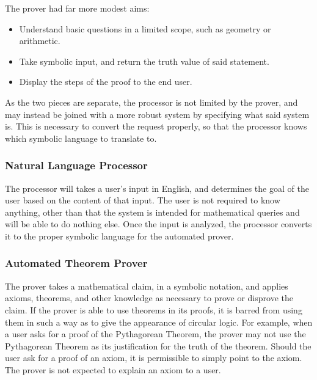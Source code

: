   The prover had far more modest aims:                                                                     
  \begin{itemize}                                                                                          
  \item{Understand basic questions in a limited scope, such as geometry or arithmetic.}                    
  \item{Take symbolic input, and return the truth value of said statement.}                                
  \item{Display the steps of the proof to the end user.}                                 

  \end{itemize}

  As the two pieces are separate, the processor is not limited by the prover, and may instead be joined with a more robust system by specifying what said system is. This is necessary to convert the request properly, so that the processor knows which symbolic language to translate to.                                 
  \subsubsection{Natural Language Processor}                                                               
The processor will takes a user's input in English, and determines the goal of the user based on the content of that input. The user is not required to know anything, other than that the system is intended for mathematical queries and will be able to do nothing else. Once the input is analyzed, the processor converts it to the proper symbolic language for the automated prover.                                         
  \subsubsection{Automated Theorem Prover}                                                                 
                                                                                                           
  The prover takes a mathematical claim, in a symbolic notation, and applies axioms, theorems, and other knowledge as necessary to prove or disprove the claim. If the prover is able to use theorems in its proofs, it is barred from using them in such a way as to give the appearance of circular logic. For example, when a user asks for a proof of the Pythagorean Theorem, the prover may not use the Pythagorean Theorem as its justification for the truth of the theorem. %
Should the user ask for a proof of an axiom, it is permissible to simply point to the axiom. The prover is not expected to explain an axiom to a user.   
